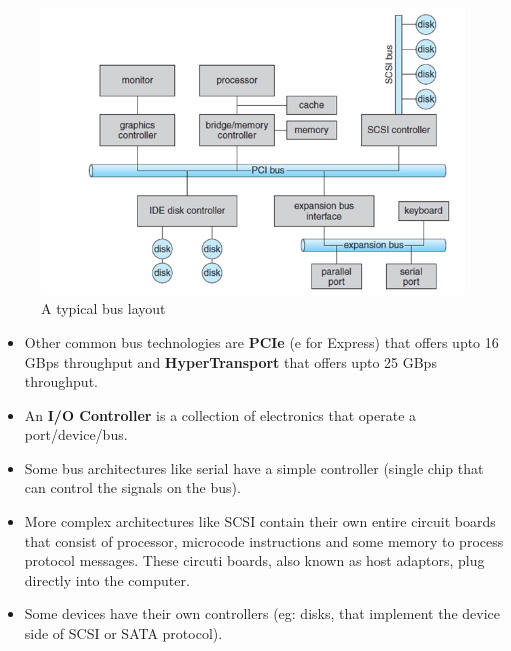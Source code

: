 \documentclass{article}
\theoremstyle{plain}
\theoremstyle{definition}
\begin{document}
\begin{figure}[!h]
    \centering
    \includegraphics[scale=0.6]{os1.png}
    \caption{A typical bus layout}
    \label{fig:my_label_1}
\end{figure}

\begin{itemize}
    \item Other common bus technologies are \textbf{PCIe} (e for Express) that offers upto 16 GBps throughput and \textbf{HyperTransport} that offers upto 25 GBps throughput. 
    
    \item An \textbf{I/O Controller} is a collection of electronics that operate a port/device/bus. 
    \item Some bus architectures like serial have a simple controller (single chip that can control the signals on the bus). 
    
    \item More complex architectures like SCSI contain their own entire circuit boards that consist of processor, microcode instructions and some memory to process protocol messages. These circuti boards, also known as host adaptors, plug directly into the computer.
    
    \item Some devices have their own controllers (eg: disks, that implement the device side of SCSI or SATA protocol). 
\end{itemize}
\end{document}
